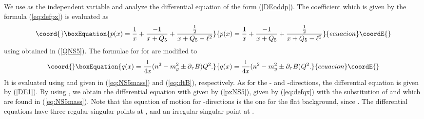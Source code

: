 \documentclass[a4paper,12pt]{article}
\begin{document}
We use \coordHE{} as the independent variable and analyze the
differential equation of the form (\ref{DEoddp}). 
The coefficient \coordHE{} which is given by the formula
(\ref{eq:defpx}) is evaluated as
\begin{equation}\coord{}\boxEquation{
p(x)={1\over x}+{-1\over x+Q_{5} }
+{{1\over2}\over x+Q_{5}-\ell^2}
\label{pxNS5}
}{
p(x)={1\over x}+{-1\over x+Q_{5} }
+{{1\over2}\over x+Q_{5}-\ell^2}
}{ecuacion}\coordE{}\end{equation}
using \coordHE{} obtained in (\ref{QNS5}).
The formulae for \coordHE{} for \coordHE{} 
are modified to 
\begin{equation}\coord{}\boxEquation{
q(x)= {1\over 4x}(n^2-m_{y}^2\pm \partial_{\tau} B)Q^2.
}{
q(x)= {1\over 4x}(n^2-m_{y}^2\pm \partial_{\tau} B)Q^2.
}{ecuacion}\coordE{}\end{equation}
It is evaluated using \coordHE{} and \coordHE{} given
in (\ref{eq:NS5mass}) and (\ref{eq:dtB}), respectively.
As for the \coordHE{}- and \coordHE{}-directions, the differential equation
is given by (\ref{DE1}). By using \coordHE{}, we obtain the differential
equation with \coordHE{}  given by (\ref{pxNS5}),
\coordHE{}  given by (\ref{eq:defqx}) with the substitution of
\coordHE{} and \coordHE{} which are
found in (\ref{eq:NS5mass}). 
Note that the equation of motion for 
\coordHE{}-directions is the one for the flat background,
since \coordHE{}. 
The differential equations have three regular singular
points at \coordHE{}, and an irregular
singular point at \coordHE{}. 
\end{document}
